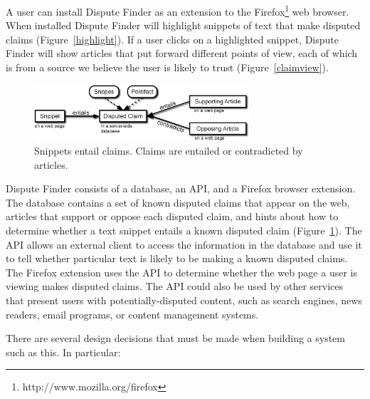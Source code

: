 \documentclass{www2010-submission}
\newcommand{\todo}[1]{}
\begin{document}
A user can install Dispute Finder as an extension to the Firefox\footnote{http://www.mozilla.org/firefox} web browser. When installed Dispute Finder will highlight snippets of text that make disputed claims (Figure~\ref{highlight}). 
If a user clicks on a highlighted snippet, Dispute Finder will show articles that put forward different points of view,  each of which is from a source we believe the user is likely to trust (Figure~\ref{claimview}). 

\begin{figure}[tb]
	\begin{center}
	\includegraphics[width=8cm]{pictures/snippet_claim_article_fancy3.png}
	\caption{Snippets entail claims. Claims are entailed or contradicted by articles.}
	\label{snippet_claim_article}
	\end{center}
\end{figure}

Dispute Finder consists of a database, an API, and a Firefox browser extension. The database contains a set of known disputed claims that appear on the web, articles that support or oppose each disputed claim, and hints about how to determine whether a text snippet entails a known disputed claim (Figure~\ref{snippet_claim_article}). The API allows an external client to access the information in the database and use it to tell whether particular text is likely to be making a known disputed claims. The Firefox extension uses the API to determine whether the web page a user is viewing makes disputed claims. The API could also be used by other services that present users with potentially-disputed content, such as search engines, news readers, email programs, or content management systems.

\todo{Figure that does a smaller highlight}

There are several design decisions that must be made when building a system such as this. In particular:
\end{document}
